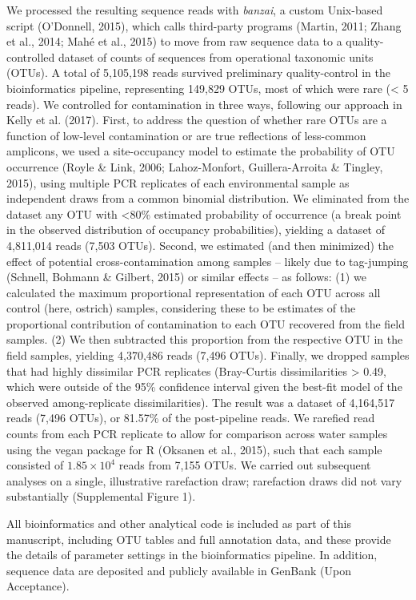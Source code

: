 \documentclass[fleqn,10pt,lineno]{wlpeerj} %
\begin{document}
We processed the resulting sequence reads with \textit{banzai}, a custom Unix-based
script (O'Donnell, 2015), which calls third-party programs (Martin,
2011; Zhang et al., 2014; Mahé et al., 2015) to move from raw sequence
data to a quality-controlled dataset of counts of sequences from
operational taxonomic units (OTUs). A total of 5,105,198 reads survived
preliminary quality-control in the bioinformatics pipeline, representing
149,829 OTUs, most of which were rare (\textless{} 5 reads). We
controlled for contamination in three ways, following our approach in
Kelly et al. (2017). First, to address the question of whether rare
OTUs are a function of low-level contamination or are true reflections
of less-common amplicons, we used a site-occupancy model to estimate the
probability of OTU occurrence (Royle \& Link, 2006; Lahoz-Monfort,
Guillera-Arroita \& Tingley, 2015), using multiple PCR replicates of
each environmental sample as independent draws from a common binomial
distribution. We eliminated from the dataset any OTU with
\textless{}80\% estimated probability of occurrence (a break point in
the observed distribution of occupancy probabilities), yielding a
dataset of 4,811,014 reads (7,503 OTUs). Second, we estimated (and then
minimized) the effect of potential cross-contamination among samples --
likely due to tag-jumping (Schnell, Bohmann \& Gilbert, 2015) or similar
effects -- as follows: (1) we calculated the maximum proportional
representation of each OTU across all control (here, ostrich) samples,
considering these to be estimates of the proportional contribution of
contamination to each OTU recovered from the field samples. (2) We then
subtracted this proportion from the respective OTU in the field samples,
yielding 4,370,486 reads (7,496 OTUs). Finally, we dropped samples that
had highly dissimilar PCR replicates (Bray-Curtis dissimilarities
\textgreater{} 0.49, which were outside of the 95\% confidence interval
given the best-fit model of the observed among-replicate
dissimilarities). The result was a dataset of 4,164,517 reads (7,496
OTUs), or 81.57\% of the post-pipeline reads. We rarefied read counts
from each PCR replicate to allow for comparison across water samples
using the vegan package for R (Oksanen et al., 2015), such that each
sample consisted of \(1.85 \times 10^4\) reads from 7,155 OTUs. We
carried out subsequent analyses on a single, illustrative rarefaction
draw; rarefaction draws did not vary substantially (Supplemental Figure
1).

All bioinformatics and other analytical code is included as part of this
manuscript, including OTU tables and full annotation data, and these
provide the details of parameter settings in the bioinformatics
pipeline. In addition, sequence data are deposited and publicly
available in GenBank (Upon Acceptance).
\end{document}
